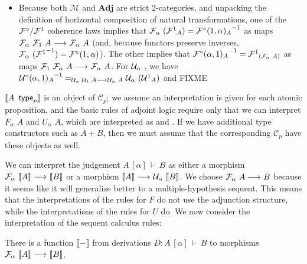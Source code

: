 \documentclass{drl-common/llncs}
\renewcommand{\sem}[1]{\ensuremath{ \llbracket #1 \rrbracket}}
\newcommand{\inv}[1]{\ensuremath{{#1}^{-1}}}
\newcommand{\C}{\ensuremath{\mathcal{C}}}
\newcommand{\M}{\ensuremath{\mathcal{M}}}
\newcommand{\arrow}[3]{\ensuremath{#2 \longrightarrow_{#1} #3}}
\newcommand{\Adj}{\textbf{Adj}}
\renewcommand\wftp[2]{\ensuremath{#1 \,\,\, \dsd{type}_{#2}}}
\newcommand\F[2]{\ensuremath{F_{#1} \,\, #2}}
\newcommand\U[2]{\ensuremath{U_{#1} \,\, #2}}
\newcommand\coprd[2]{\ensuremath{#1 + #2}}
\newcommand\seq[3]{\ensuremath{#1 \, [ #2 ] \, \vdash \, #3}}
\begin{document}
\begin{itemize}
\item Because both $\M$ and $\Adj$ are strict 2-categories, and
  unpacking the definition of horizontal composition of natural
  transformations, one of the $\mathcal{F}^\circ/{\mathcal{F}^1}$ coherence laws
  implies that $\semF{\alpha}{(\semFone_A)} = \inv{\semFcomp(1,\alpha)_A}$
  as maps ${\arrow{}{\semF{\alpha}{\semF{1}{A}}}{\semF{\alpha}{A}}}$
  (and, because functors preserve inverses,
  $\semF{\alpha}{(\inv{\semFone})} = {\semFcomp(1,\alpha)}$).  The other
  implies that $\inv{\semFcomp(\alpha,1)_{A}} =
  \semFone_{(\semF{\alpha}{A})}$  as maps
  $\arrow{}{\semF{1}{\semF{\alpha}{A}}}{\semF{\alpha}{A}}$.  
   For $\mathcal{U}_{\alpha} \,\, $, we have
  $\inv{\semUcomp(\alpha,1)_A} =_{\arrow{}{\semU{\alpha}{\semU{1}{A}}}{\semU{\alpha}{A}}} \semU{\alpha}{(\semUone_A)}$
  and FIXME

\end{itemize}

\sem{\wftp{A}{p}} is an object of $\C_p$; we assume an interpretation is
given for each atomic proposition, and the basic rules of adjoint logic
require only that we can interpret \F{\alpha}{A} and \U{\alpha}{A},
which are interpreted as \semF{\alpha}{\sem{A}} and
\semU{\alpha}{\sem{A}}. If we have additional type constructors such as
\coprd{A}{B}, then we must assume that the corresponding $\C_p$ have
these objects as well.  

We can interpret the judgement \seq{A}{\alpha}{B} as either a morphism
$\arrow{}{\semF \alpha {\sem A}}{\sem B}$ or a morphism $\arrow{}{\sem
  A}{\semU \alpha {\sem B}}$.  We choose $\arrow{}{\semF \alpha A}{B}$
because it seems like it will generalize better to a multiple-hypothesis
sequent.  This means that the interpretations of the rules for $F$ do
not use the adjunction structure, while the interpretations of the rules
for $U$ do.  We now consider the interpretation of the sequent calculus
rules:

\begin{theorem}
There is a function \sem{-} from derivations $D : \seq{A}{\alpha}{B}$ 
to morphisms \arrow{}{\semF \alpha {\sem A}}{\sem B}.
\end{theorem}
\end{document}
